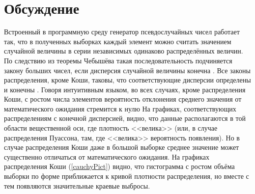 \documentclass[report1.tex]{subfiles}
\begin{document}
\newpage
\section{Обсуждение}
Встроенный в программную среду генератор псевдослучайных чисел работает так, что в полученных выборках каждый элемент можно считать значением случайной величины в серии независимых одинаково распределённых величин. По следствию из теоремы Чебышёва такая последовательность подчиняется закону больших чисел, если дисперсия случайной величины конечна \cite{sevastianov}. Все законы распределения, кроме Коши, таковы, что соответствующие дисперсии определены и конечны \cite{koroluk}. Говоря интуитивным языком, во всех случаях, кроме распределения Коши, с ростом числа элементов вероятность отклонения среднего значения от математического ожидания стремится к нулю На графиках, соответствующих распределениям с конечной дисперсией, видно, что данные располагаются в той области вещественной оси, где плотность <<велика>> (или, в случае распределения Пуассона, там, где <<велика>> вероятность появления). Но в случае распределения Коши даже в большой выборке среднее значение может существенно отличаться от математического ожидания. На графиках распределения Коши (\ref{cauchyPict}) видно, что гистограмма с ростом объёма выборки по форме приближается к кривой плотности распределения, но вместе с тем появляются значительные краевые выбросы.
\end{document}
